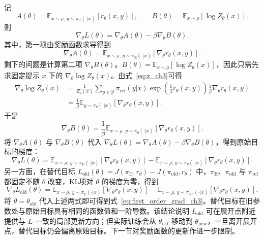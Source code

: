 记
\begin{equation}
    A(\theta)=
    \mathbb{E}_{x\sim\rho,\,y\sim\pi_{\mathrm{E}}(\cdot|x)}
    \left[r_\theta(x,y)\right],\qquad
    B(\theta)=
    \mathbb{E}_{x\sim\rho}\left[\log Z_\theta(x)\right].
\end{equation}
则
\begin{equation}
    \nabla_\theta L(\theta)=\nabla_\theta A(\theta)-\beta\nabla_\theta B(\theta).
\end{equation}
其中，第一项由奖励函数求导得到
\begin{equation}
    \nabla_\theta A(\theta)
    =
    \mathbb{E}_{x\sim\rho,\,y\sim\pi_{\mathrm{E}}(\cdot|x)}
    \left[\nabla_\theta r_\theta(x,y)\right].
\end{equation}
剩下的问题是计算第二项 $\nabla_\theta B(\theta)$。$B(\theta)=\mathbb{E}_{x\sim\rho}[\log Z_\theta(x)]$，因此只需先求固定提示 $x$ 下的 $\nabla_\theta\log Z_\theta(x)$。由式~\eqref{eq:z_ch3}可得
\begin{equation}
\begin{aligned}
    \nabla_\theta \log Z_\theta(x)
    &=
    \frac{1}{Z_\theta(x)}
    \sum_{y\in\mathcal{Y}}\pi_{\mathrm{ref}}(y|x)
    \exp\left(\frac{1}{\beta}r_\theta(x,y)\right)
    \frac{1}{\beta}\nabla_\theta r_\theta(x,y)\\
    &=
    \frac{1}{\beta}
    \mathbb{E}_{y\sim\pi_\theta(\cdot|x)}
    \left[\nabla_\theta r_\theta(x,y)\right].
\end{aligned}
\end{equation}
于是
\begin{equation}
    \nabla_\theta B(\theta)
    =
    \frac{1}{\beta}
    \mathbb{E}_{x\sim\rho,\,y\sim\pi_\theta(\cdot|x)}
    \left[\nabla_\theta r_\theta(x,y)\right].
\end{equation}
将 $\nabla_\theta A(\theta)$ 与 $\nabla_\theta B(\theta)$ 代入 $\nabla_\theta L(\theta)=\nabla_\theta A(\theta)-\beta\nabla_\theta B(\theta)$，得到原始目标的梯度：
\begin{equation}
    \nabla_\theta L(\theta)
    =
    \mathbb{E}_{x\sim\rho,\,y\sim\pi_{\mathrm{E}}(\cdot|x)}
    \left[\nabla_\theta r_\theta(x,y)\right]
    -
    \mathbb{E}_{x\sim\rho,\,y\sim\pi_\theta(\cdot|x)}
    \left[\nabla_\theta r_\theta(x,y)\right].
\end{equation}
另一方面，在替代目标 $L_{\mathrm{old}}(\theta)=J(\pi_{\mathrm{E}},r_\theta)-J(\pi_{\mathrm{old}},r_\theta)$ 中，$\pi_{\mathrm{E}}$、$\pi_{\mathrm{old}}$ 与 $\pi_{\mathrm{ref}}$ 都固定不随 $\theta$ 改变，KL项对 $\theta$ 的梯度为零，得到
\begin{equation}
    \nabla_\theta L_{\mathrm{old}}(\theta)
    =
    \mathbb{E}_{x\sim\rho,\,y\sim\pi_{\mathrm{E}}(\cdot|x)}
    \left[\nabla_\theta r_\theta(x,y)\right]
    -
    \mathbb{E}_{x\sim\rho,\,y\sim\pi_{\mathrm{old}}(\cdot|x)}
    \left[\nabla_\theta r_\theta(x,y)\right].
\end{equation}
将 $\theta=\theta_{\mathrm{old}}$ 代入上述两式即可得到式~\eqref{eq:first_order_grad_ch3}。替代目标在旧参数处与原始目标具有相同的函数值和一阶导数。该结论说明 $L_{\mathrm{old}}$ 可在展开点附近提供与 $L$ 一致的局部更新方向；但实际训练会从 $\theta_{\mathrm{old}}$ 移动到 $\theta_{\mathrm{new}}$，一旦离开展开点，替代目标仍会偏离原始目标。下一节对奖励函数的更新作进一步限制。

